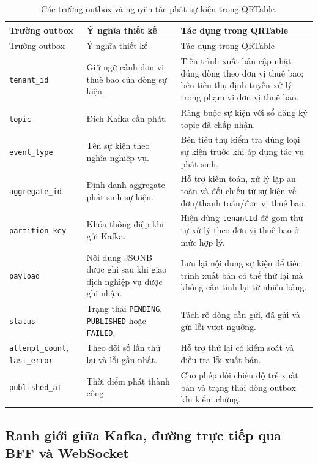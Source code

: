{\footnotesize
\setlength{\tabcolsep}{3pt}
\begin{longtable}{>{\raggedright\arraybackslash}p{}>{\raggedright\arraybackslash}p{}>{\raggedright\arraybackslash}p{}}
  \caption{Các trường outbox và nguyên tắc phát sự kiện trong QRTable.}
  \label{tab:chapter4-outbox-discipline}\\
  \toprule
  Trường outbox & Ý nghĩa thiết kế & Tác dụng trong QRTable \\
  \midrule
  \endfirsthead
  \toprule
  Trường outbox & Ý nghĩa thiết kế & Tác dụng trong QRTable \\
  \midrule
  \endhead
  \bottomrule
  \endfoot
  \texttt{tenant\_id} & Giữ ngữ cảnh đơn vị thuê bao của dòng sự kiện. & Tiến trình xuất bản cập nhật đúng dòng theo đơn vị thuê bao; bên tiêu thụ định tuyến xử lý trong phạm vi đơn vị thuê bao. \\
  \texttt{topic} & Đích Kafka cần phát. & Ràng buộc sự kiện với sổ đăng ký topic đã chấp nhận. \\
  \texttt{event\_type} & Tên sự kiện theo nghĩa nghiệp vụ. & Bên tiêu thụ kiểm tra đúng loại sự kiện trước khi áp dụng tác vụ phát sinh. \\
  \texttt{aggregate\_id} & Định danh aggregate phát sinh sự kiện. & Hỗ trợ kiểm toán, xử lý lặp an toàn và đối chiếu từ sự kiện về đơn/thanh toán/đơn vị thuê bao. \\
  \texttt{partition\_key} & Khóa thông điệp khi gửi Kafka. & Hiện dùng \texttt{tenantId} để gom thứ tự xử lý theo đơn vị thuê bao ở mức hợp lý. \\
  \texttt{payload} & Nội dung JSONB được ghi sau khi giao dịch nghiệp vụ được ghi nhận. & Lưu lại nội dung sự kiện để tiến trình xuất bản có thể thử lại mà không cần tính lại từ nhiều bảng. \\
  \texttt{status} & Trạng thái \texttt{PENDING}, \texttt{PUBLISHED} hoặc \texttt{FAILED}. & Tách rõ dòng cần gửi, đã gửi và gửi lỗi vượt ngưỡng. \\
  \texttt{attempt\_count}, \texttt{last\_error} & Theo dõi số lần thử lại và lỗi gần nhất. & Hỗ trợ thử lại có kiểm soát và điều tra lỗi xuất bản. \\
  \texttt{published\_at} & Thời điểm phát thành công. & Cho phép đối chiếu độ trễ xuất bản và trạng thái dòng outbox khi kiểm chứng. \\
\end{longtable}
}

\subsection{Ranh giới giữa Kafka, đường trực tiếp qua BFF và WebSocket}

